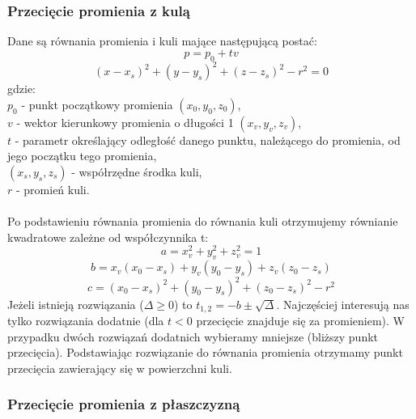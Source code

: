 \subsubsection{Przecięcie promienia z kulą}
Dane są równania promienia i kuli mające następującą postać:
$$p = p_0 + tv$$
$$(x - x_s)^2 + (y - y_s)^2 + (z - z_s)^2 - r^2 = 0$$
gdzie:
\\
$p_0$ - punkt początkowy promienia $(x_0, y_0, z_0)$, \\
$v$ - wektor kierunkowy promienia o długości 1 $(x_v, y_v, z_v)$, \\
$t$ - parametr określający odległość danego punktu, należącego do promienia, od jego początku tego promienia, \\
$(x_s, y_s, z_s)$ - współrzędne środka kuli, \\
$r$ - promień kuli. \\
\\
Po podstawieniu równania promienia do równania kuli otrzymujemy równianie kwadratowe zależne od współczynnika t:
$$a = x_v^2 + y_v^2 + z_v^2 = 1$$
$$b = x_v(x_0 - x_s) + y_v(y_0 - y_s) + z_v(z_0 - z_s)$$
$$c = (x_0 - x_s)^2 + (y_0 - y_s)^2 + (z_0 - z_s)^2 - r^2$$
Jeżeli istnieją rozwiązania ($\Delta \geq 0$) to $t_{1,2} = -b \pm \sqrt{\Delta}$. Najczęściej interesują nas tylko rozwiązania dodatnie (dla $t < 0$ przecięcie znajduje się za promieniem). W przypadku dwóch rozwiązań dodatnich wybieramy mniejsze (bliższy punkt przecięcia). Podstawiając rozwiązanie do równania promienia otrzymamy punkt przecięcia zawierający się w powierzchni kuli.

\subsubsection{Przecięcie promienia z płaszczyzną}

